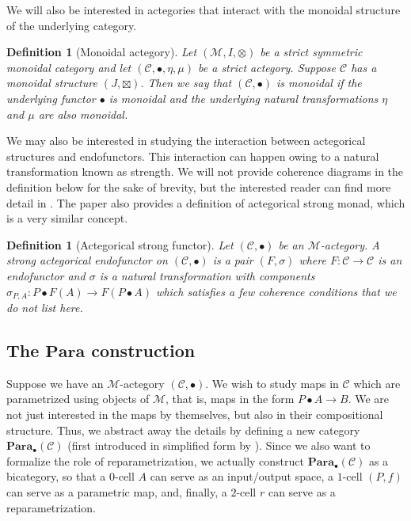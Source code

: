 \documentclass[11pt,a4paper,openright,twoside]{report}
\newcounter{mycounter}
\theoremstyle{plain}
\newtheorem{definition}[mycounter]{Definition}
\theoremstyle{definition}
\begin{document}
We will also be interested in actegories that interact with the monoidal structure of the underlying category.

\begin{definition}[Monoidal actegory]
  Let $(\mathcal{M},I,\otimes)$ be a strict symmetric monoidal category and let $(\mathcal{C}, \bullet, \eta, \mu)$ be a strict actegory. Suppose $\mathcal{C}$ has a monoidal structure $(J,\boxtimes)$. Then we say that $(\mathcal{C}, \bullet)$ is monoidal if the underlying functor $\bullet$ is monoidal and the underlying natural transformations $\eta$ and $\mu$ are also monoidal.
\end{definition}

We may also be interested in studying the interaction between actegorical structures and endofunctors. This interaction can happen owing to a natural transformation known as strength. We will not provide coherence diagrams in the definition below for the sake of brevity, but the interested reader can find more detail in \cite{gavranovicposition}. The paper also provides a definition of actegorical strong monad, which is a very similar concept.

\begin{definition}[Actegorical strong functor]
  Let $(\mathcal{C}, \bullet)$ be an $\mathcal{M}$-actegory. A strong actegorical endofunctor on $(\mathcal{C}, \bullet)$ is a pair $(F, \sigma)$ where $F: \mathcal{C} \to \mathcal{C}$ is an endofunctor and $\sigma$ is a natural transformation with components $\sigma_{P,A}: P \bullet F(A) \to F(P \bullet A)$ which satisfies a few coherence conditions that we do not list here.
\end{definition}

\subsection{The $\mathbf{Para}$ construction}

Suppose we have an $\mathcal{M}$-actegory $(\mathcal{C}, \bullet)$. We wish to study maps in $\mathcal{C}$ which are parametrized using objects of $\mathcal{M}$, that is, maps in the form $P \bullet A \to B$. We are not just interested in the maps by themselves, but also in their compositional structure. Thus, we abstract away the details by defining a new category $\mathbf{Para}_{\bullet}(\mathcal{C})$ (first introduced in simplified form by \cite{fong2019backprop}). Since we also want to formalize the role of reparametrization, we actually construct $\mathbf{Para}_{\bullet}(\mathcal{C})$ as a bicategory, so that a $0$-cell $A$ can serve as an input/output space, a $1$-cell $(P,f)$ can serve as a parametric map, and, finally, a $2$-cell $r$ can serve as a reparametrization.
\end{document}
